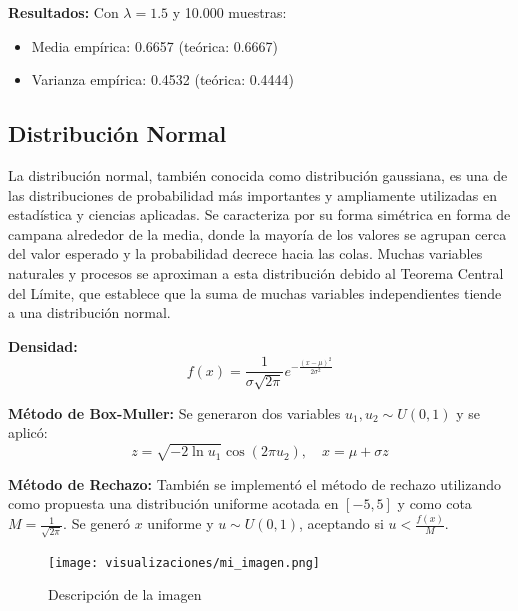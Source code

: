 \documentclass{article}
\begin{document}
\textbf{Resultados:} Con $\lambda = 1.5$ y 10.000 muestras:
\begin{itemize}
\item Media empírica: 0.6657 (teórica: 0.6667)
\item Varianza empírica: 0.4532 (teórica: 0.4444)
\end{itemize}

\subsection{Distribución Normal}
La distribución normal, también conocida como distribución gaussiana, es una de las distribuciones de probabilidad más importantes y ampliamente utilizadas en estadística y ciencias aplicadas. Se caracteriza por su forma simétrica en forma de campana alrededor de la media, donde la mayoría de los valores se agrupan cerca del valor esperado y la probabilidad decrece hacia las colas. Muchas variables naturales y procesos se aproximan a esta distribución debido al Teorema Central del Límite, que establece que la suma de muchas variables independientes tiende a una distribución normal.

\textbf{Densidad:}
\begin{equation}
f(x) = \frac{1}{\sigma \sqrt{2\pi}} e^{-\frac{(x - \mu)^2}{2\sigma^2}}
\end{equation}

\textbf{Método de Box-Muller:} Se generaron dos variables $u_1, u_2 \sim U(0,1)$ y se aplicó:
\begin{equation}
z = \sqrt{-2 \ln u_1} \cos(2\pi u_2), \quad x = \mu + \sigma z
\end{equation}

\textbf{Método de Rechazo:} También se implementó el método de rechazo utilizando como propuesta una distribución uniforme acotada en $[-5,5]$ y como cota $M = \frac{1}{\sqrt{2\pi}}$. Se generó $x$ uniforme y $u \sim U(0,1)$, aceptando si $u < \frac{f(x)}{M}$.
\begin{figure}[H] %
    \centering
    \texttt{[image: visualizaciones/mi\_imagen.png]}
    \caption{Descripción de la imagen}
    \label{fig:mi_imagen}
\end{figure}
\end{document}

